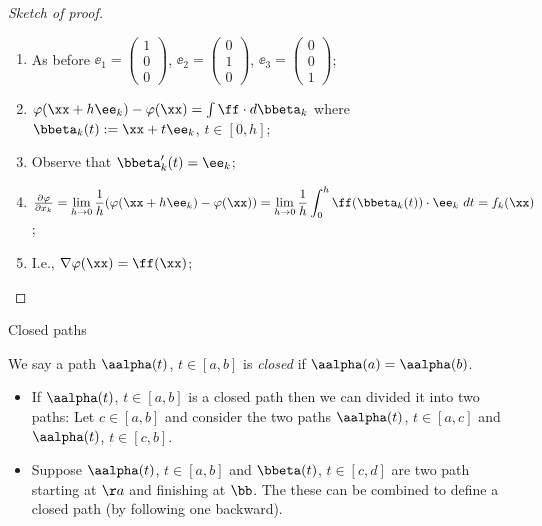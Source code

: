     \begin{proof}[Sketch of proof]
        \begin{enumerate}
            \item As before \(\ee_1 = \left(\begin{smallmatrix}
                      1 \\ 0 \\ 0
                  \end{smallmatrix}\right) \),
                  \(\ee_2 = \left(\begin{smallmatrix}
                      0 \\ 1 \\ 0
                  \end{smallmatrix}\right) \),
                  \(\ee_3 = \left(\begin{smallmatrix}
                      0 \\ 0 \\ 1
                  \end{smallmatrix}\right) \);
            \item \(\varphi(\xx + h \ee_k) - \varphi(\xx) = \int \ff \cdot d\bbeta_k\) where \(\bbeta_k(t) := \xx + t \ee_k\), \(t\in [0,h]\);
            \item Observe that \(\bbeta'_k(t) = \ee_k\);
            \item \(\frac{\partial \varphi}{\partial x_k} =  \displaystyle\lim_{h\to 0} \frac{1}{h}( \varphi(\xx + h \ee_k) - \varphi(\xx)) = \displaystyle \lim_{h\to 0} \frac{1}{h} \int_0^h \ff(\bbeta_k(t)) \cdot \ee_k \ dt = f_k(\xx)  \);
            \item I.e., \(\nabla \varphi (\xx) =  \ff(\xx)\);
        \end{enumerate}
    \end{proof}





    {Closed paths}

    \begin{definition}
        We say a path \(\aalpha(t)\), \(t\in [a,b]\) is \emph{closed} if \(\aalpha(a) = \aalpha(b)\).
    \end{definition}


    
        \begin{itemize}
            \item If \(\aalpha(t)\), \(t\in[a,b]\) is a closed path then we can divided it into two paths: Let \(c\in[a,b]\) and consider the two paths \(\aalpha(t)\), \(t\in[a,c]\) and  \(\aalpha(t)\), \(t\in[c,b]\).
            \item Suppose \(\aalpha(t)\), \(t\in [a,b]\) and  \(\bbeta(t)\), \(t\in [c,d]\) are two path starting at \(\aa\) and finishing at \(\bb\). The these can be combined to define a closed path (by following one backward).
        \end{itemize}
    





